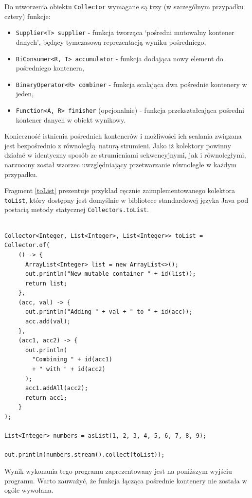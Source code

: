 \documentclass[12pt]{extarticle}
\begin{document}
    Do utworzenia obiektu \texttt{Collector} wymagane są trzy (w szczególnym przypadku cztery) funkcje:

\begin{itemize}
    \item \texttt{Supplier<T> supplier} - funkcja tworząca `pośredni mutowalny kontener danych', będący tymczasową reprezentacją wyniku pośredniego,
    \item \texttt{BiConsumer<R, T> accumulator} - funkcja dodająca nowy element do pośredniego kontenera,
    \item \texttt{BinaryOperator<R> combiner} - funkcja scalająca dwa pośrednie kontenery w jeden,
    \item \texttt{Function<A, R> finisher} (opcjonalnie) - funkcja przekształcająca pośredni kontener danych w obiekt wynikowy.
\end{itemize}

    Konieczność istnienia pośrednich kontenerów i możliwości ich scalania związana jest bezpośrednio z równoległą naturą strumieni. Jako iż kolektory powinny działać w identyczny sposób ze strumieniami sekwencyjnymi, jak i równoległymi, narzucony został wzorzec uwzględniający przetwarzanie równoległe w każdym przypadku.

    Fragment \ref{toList} prezentuje przykład ręcznie zaimplementowanego kolektora \texttt{toList}, który dostępny jest domyślnie w bibliotece standardowej języka Java pod postacią metody statycznej \texttt{Collectors.toList}.

\begin{lstlisting}[label=toList, caption=Ręczna implementacja \texttt{toList}]

Collector<Integer, List<Integer>, List<Integer>> toList =
Collector.of(
    () -> {
      ArrayList<Integer> list = new ArrayList<>();
      out.println("New mutable container " + id(list));
      return list;
    },
    (acc, val) -> {
      out.println("Adding " + val + " to " + id(acc));
      acc.add(val);
    },
    (acc1, acc2) -> {
      out.println(
        "Combining " + id(acc1)
        + " with " + id(acc2)
      );
      acc1.addAll(acc2);
      return acc1;
    }
);

List<Integer> numbers = asList(1, 2, 3, 4, 5, 6, 7, 8, 9);

out.println(numbers.stream().collect(toList));

\end{lstlisting}

Wynik wykonania tego programu zaprezentowany jest na poniższym wyjściu programu. Warto zauważyć, że funkcja łącząca pośrednie kontenery nie została w ogóle wywołana. 
    
\end{document}
